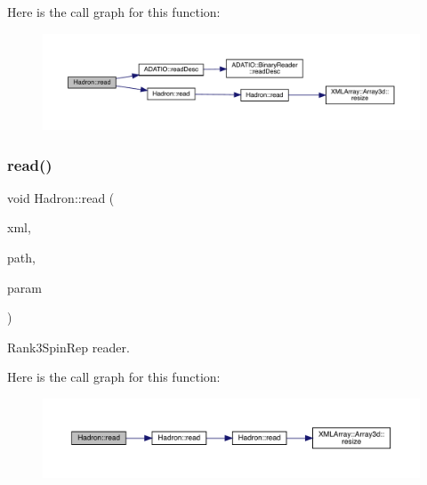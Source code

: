 Here is the call graph for this function\+:\nopagebreak
\begin{figure}[H]
\begin{center}
\leavevmode
\includegraphics[width=350pt]{d1/daf/namespaceHadron_a0567f3fb8f2db68b0a93251138c13a62_cgraph}
\end{center}
\end{figure}
\mbox{\label{namespaceHadron_a2d26ed6a48c098506babe8e03425a183}} 
\subsubsection{\texorpdfstring{read()}{read()}\hspace{0.1cm}{\footnotesize\ttfamily [82/94]}}
{\footnotesize\ttfamily void Hadron\+::read (\begin{DoxyParamCaption}\item[{\mbox{\hyperlink{classADATXML_1_1XMLReader}{X\+M\+L\+Reader}} \&}]{xml,  }\item[{const std\+::string \&}]{path,  }\item[{\mbox{\hyperlink{structHadron_1_1Rank3SpinRep__t}{Rank3\+Spin\+Rep\+\_\+t}} \&}]{param }\end{DoxyParamCaption})}



Rank3\+Spin\+Rep reader. 

Here is the call graph for this function\+:\nopagebreak
\begin{figure}[H]
\begin{center}
\leavevmode
\includegraphics[width=350pt]{d1/daf/namespaceHadron_a2d26ed6a48c098506babe8e03425a183_cgraph}
\end{center}
\end{figure}
\mbox{\label{namespaceHadron_a05878acca51117e3c410ba16500c4ba5}} 
